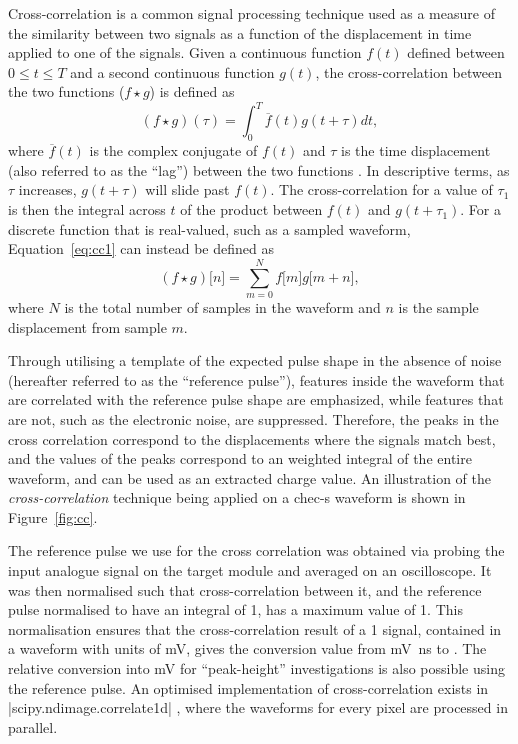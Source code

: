 Cross-correlation is a common signal processing technique used as a measure of the similarity between two signals as a function of the displacement in time applied to one of the signals. Given a continuous function $f(t)$ defined between $0 \le t \le T$ and a second continuous function $g(t)$, the cross-correlation between the two functions ($f \star g$) is defined as 
\begin{equation} \label{eq:cc1}
(f \star g)(\tau) = \int_0^T \overline{f}(t)g(t + \tau)dt,
\end{equation}
where $\overline{f}(t)$ is the complex conjugate of $f(t)$ and $\tau$ is the time displacement (also referred to as the ``lag'') between the two functions \cite{wolfram-crosscorrelate}. In descriptive terms, as $\tau$ increases, $g(t + \tau)$ will slide past $f(t)$. The cross-correlation for a value of $\tau_1$ is then the integral across $t$ of the product between $f(t)$ and $g(t + \tau_1)$. For a discrete function that is real-valued, such as a sampled waveform, Equation~\ref{eq:cc1} can instead be defined as
\begin{equation} \label{eq:cc2}
(f \star g)\lbrack n \rbrack = \sum_{m=0}^N f\lbrack m \rbrack g\lbrack m + n\rbrack,
\end{equation}
where $N$ is the total number of samples in the waveform and $n$ is the sample displacement from sample $m$. 

Through utilising a template of the expected pulse shape in the absence of noise (hereafter referred to as the ``reference pulse''), features inside the waveform that are correlated with the reference pulse shape are emphasized, while features that are not, such as the electronic noise, are suppressed. Therefore, the peaks in the cross correlation correspond to the displacements where the signals match best, and the values of the peaks correspond to an weighted integral of the entire waveform, and can be used as an extracted charge value. An illustration of the \textit{cross-correlation} technique being applied on a \gls{chec-s} waveform is shown in Figure~\ref{fig:cc}. 

The reference pulse we use for the cross correlation was obtained via probing the input analogue signal on the \gls{target} module and averaged on an oscilloscope. It was then normalised such that cross-correlation between it, and the reference pulse normalised to have an integral of 1, has a maximum value of 1. This normalisation ensures that the cross-correlation result of a \SI{1}{\pe} signal, contained in a waveform with units of \si{mV}, gives the conversion value from \si{mV ns} to \si{\pe}. The relative conversion into \si{mV} for ``peak-height'' investigations is also possible using the reference pulse. An optimised implementation of cross-correlation exists in |scipy.ndimage.correlate1d| \cite{scipy-crosscorrelate}, where the waveforms for every pixel are processed in parallel. 

